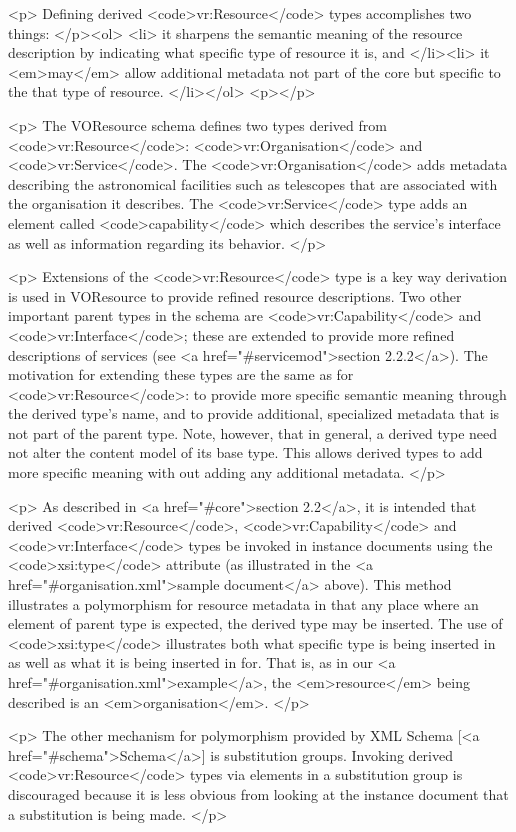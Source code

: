 \documentclass[11pt,a4paper]{ivoa}
\begin{document}
<p>
Defining derived <code>vr:Resource</code> types accomplishes two
things:
</p><ol>
  <li> it sharpens the semantic meaning of the resource description by
       indicating what specific type of resource it is, and
  </li><li> it <em>may</em> allow additional metadata not part of the core
       but specific to the that type of resource.
</li></ol>
<p></p>

<p>
The VOResource schema defines two types derived from
<code>vr:Resource</code>:  <code>vr:Organisation</code> and
<code>vr:Service</code>.   The <code>vr:Organisation</code> adds
metadata describing the astronomical facilities such as telescopes
that are associated with the organisation it describes.  The
<code>vr:Service</code> type adds an element called
<code>capability</code> which describes the service's interface as
well as information regarding its behavior.  
</p>

<p>
Extensions of the <code>vr:Resource</code> type is a key way
derivation is used in VOResource to provide refined resource
descriptions.  Two other important parent types in the schema are
<code>vr:Capability</code> and <code>vr:Interface</code>; these are
extended to provide more refined descriptions of services (see <a href="#servicemod">section 2.2.2</a>).  The motivation for extending
these types are the same as for <code>vr:Resource</code>: to provide
more specific semantic meaning through the derived type's name, and to
provide additional, specialized metadata that is not part of the
parent type.  Note, however, that in general, a derived type need not
alter the content model of its base type.  This allows derived types
to add more specific meaning with out adding any additional metadata.
</p>

<p>
As described in <a href="#core">section 2.2</a>, it is intended that
derived <code>vr:Resource</code>, <code>vr:Capability</code> and
<code>vr:Interface</code> types be invoked in instance
documents using the <code>xsi:type</code> attribute (as illustrated in
the <a href="#organisation.xml">sample document</a> above).  This
method illustrates a polymorphism for resource metadata in that any
place where an element of parent type is expected, the derived type
may be inserted.  The use of <code>xsi:type</code> illustrates both
what specific type is being inserted in as well as what it is being
inserted in for.  That is, as in our
<a href="#organisation.xml">example</a>, the <em>resource</em> being
described is an <em>organisation</em>.  
</p>

<p>
The other mechanism for polymorphism provided by XML Schema
[<a href="#schema">Schema</a>] is substitution groups.  Invoking
derived <code>vr:Resource</code> types via elements in a substitution
group is discouraged because it is less obvious from looking at the
instance document that a substitution is being made.  
</p>
\end{document}

